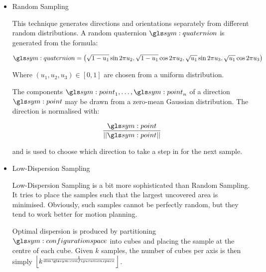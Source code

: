 				\begin{itemize}

					\item Random Sampling

						This technique generates directions and orientations
						separately from different random distributions.  A
						random quaternion $\quaternion$ is generated from the
						formula:

						\begin{equation}
							\quaternion =
								\left(
									\sqrt
									{%
										1 - u_1
									}
									\sin
										2\pi u_2
									,
									\sqrt
									{%
										1 - u_1
									}
									\cos
										2\pi u_2
									,
									\sqrt
									{%
										u_1
									}
									\sin
										2\pi u_3
									,
									\sqrt
									{%
										u_1
									}
									\cos
										2\pi u_3
								\right)
						\end{equation}

						Where
						\(
							(u_1, u_2, u_3) \in [0, 1]
						\)
						are chosen from a uniform distribution.

						The components
						\(
							\point_1, \ldots, \point_n
						\)
						of a direction $\point$ may be drawn from a zero-mean
						Gaussian distribution. The direction is normalised with:

						\begin{equation}
							\frac{\point}{\norm{\point}}
						\end{equation}

						and is used to choose which direction to take a step in
						for the next sample.

					\item Low-Dispersion Sampling

						Low-Dispersion Sampling is a bit more sophisticated than
						Random Sampling. It tries to place the samples such that
						the largest uncovered area is minimised. Obviously, such
						samples cannot be perfectly random, but they tend to
						work better for motion planning.


						Optimal dispersion is produced by partitioning
						$\configurationspace$ into cubes and placing the sample
						at the centre of each cube. Given $k$ samples, the
						number of cubes per axis is then simply
						\(
							\floor*{k^{\frac{1}{\dim{\configurationspace}}}}
						\).


\end{itemize}
